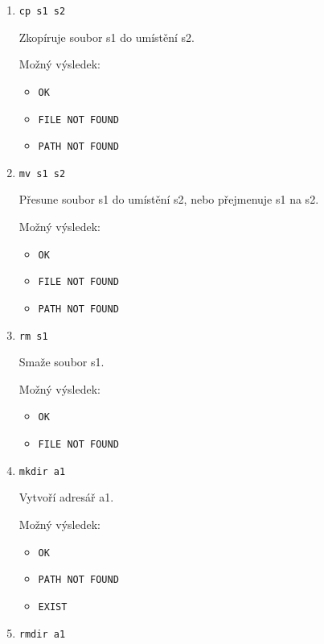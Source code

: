 \documentclass[a4paper, 12pt]{report}
\begin{document}
\begin{enumerate}
    \item \texttt{cp s1 s2}

    Zkopíruje soubor s1 do umístění s2.

    Možný výsledek:

    \begin{itemize}
        \item[] \texttt{OK}
        \item[] \texttt{FILE NOT FOUND}
        \item[] \texttt{PATH NOT FOUND}
    \end{itemize}

    \item \texttt{mv s1 s2}

    Přesune soubor s1 do umístění s2, nebo přejmenuje s1 na s2.

    Možný výsledek:

    \begin{itemize}
        \item[] \texttt{OK}
        \item[] \texttt{FILE NOT FOUND}
        \item[] \texttt{PATH NOT FOUND}
    \end{itemize}

    \item \texttt{rm s1}

    Smaže soubor s1.

    Možný výsledek:

    \begin{itemize}
        \item[] \texttt{OK}
        \item[] \texttt{FILE NOT FOUND}
    \end{itemize}

    \item \texttt{mkdir a1}

    Vytvoří adresář a1.

    Možný výsledek:

    \begin{itemize}
        \item[] \texttt{OK}
        \item[] \texttt{PATH NOT FOUND}
        \item[] \texttt{EXIST}
    \end{itemize}

    \item \texttt{rmdir a1}


\end{enumerate}
\end{document}
